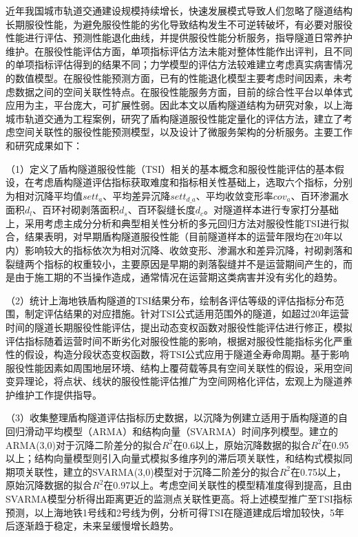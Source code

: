 
\begin{cabstract}

近年我国城市轨道交通建设规模持续增长，快速发展模式导致人们忽略了隧道结构长期服役性能，为避免服役性能的劣化导致结构发生不可逆转破坏，有必要对服役性能进行评估、预测性能退化曲线，并提供服役性能分析服务，指导隧道日常养护维护。在服役性能评估方面，单项指标评估方法未能对整体性能作出评判，且不同的单项指标评估得到的结果不同；力学模型的评估方法较难建立考虑真实病害情况的数值模型。在服役性能预测方面，已有的性能退化模型主要考虑时间因素，未考虑数据之间的空间关联性特点。在服役性能服务方面，目前的综合性平台以单体式应用为主，平台庞大，可扩展性弱。因此本文以盾构隧道结构为研究对象，以上海城市轨道交通为工程案例，研究了盾构隧道服役性能定量化的评估方法，建立了考虑空间关联性的服役性能预测模型，以及设计了微服务架构的分析服务。主要工作和研究成果如下：

（1）定义了盾构隧道服役性能（TSI）相关的基本概念和服役性能评估的基本假设，在考虑盾构隧道评估指标获取难度和指标相关性基础上，选取六个指标，分别为相对沉降平均值${sett}_{a}$、平均差异沉降$set{{t}_{d\_a}}$、平均收敛变形率${cov}_{a}$、百环渗漏水面积${d}_{l}$、百环衬砌剥落面积${d}_{s}$、百环裂缝长度${d}_{c}$。对隧道样本进行专家打分基础上，采用考虑主成分分析和典型相关性分析的多元回归方法对服役性能TSI进行拟合，结果表明，对早期盾构隧道服役性能（目前隧道样本的运营年限均在20年以内）影响较大的指标依次为相对沉降、收敛变形、渗漏水和差异沉降，衬砌剥落和裂缝两个指标的权重较小，主要原因是早期的剥落裂缝并不是运营期间产生的，而是由于施工期的不当操作造成，通常情况在运营期这类病害并没有劣化的趋势。

（2）统计上海地铁盾构隧道的TSI结果分布，绘制各评估等级的评估指标分布范围，制定评估结果的对应措施。针对TSI公式适用范围外的隧道，如超过20年运营时间的隧道长期服役性能评估，提出动态变权函数对服役性能评估进行修正，模拟评估指标随着运营时间不断劣化对服役性能的影响，根据对服役性能指标劣化严重性的假设，构造分段状态变权函数，将TSI公式应用于隧道全寿命周期。基于影响服役性能因素如周围地层环境、结构上覆荷载等具有空间关联性的假设，采用空间变异理论，将点状、线状的服役性能评估推广为空间网格化评估，宏观上为隧道养护维护工作提供指导。

（3）收集整理盾构隧道评估指标历史数据，以沉降为例建立适用于盾构隧道的自回归滑动平均模型（ARMA）和结构向量（SVARMA）时间序列模型。建立的ARMA(3,0)对于沉降二阶差分的拟合$R^2$在0.6以上，原始沉降数据的拟合$R^2$在0.95以上；结构向量模型则引入向量式模拟多维序列的滞后项关联性，和结构式模拟同期项关联性，建立的SVARMA(3,0)模型对于沉降二阶差分的拟合$R^2$在0.75以上，原始沉降数据的拟合$R^2$在0.97以上。考虑空间关联性的模型精准度得到提高，且由SVARMA模型分析得出距离更近的监测点关联性更高。将上述模型推广至TSI指标预测，以上海地铁1号线和2号线为例，分析可得TSI在隧道建成后增加较快，5年后逐渐趋于稳定，未来呈缓慢增长趋势。


\end{cabstract}
